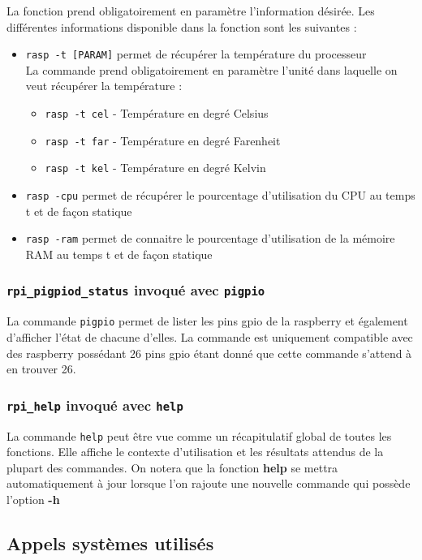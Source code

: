 \documentclass[10pt,a4paper]{article}
\begin{document}
La fonction prend obligatoirement en paramètre l'information désirée. Les différentes informations disponible dans la fonction sont les suivantes :

\begin{itemize}
\item \texttt{rasp -t [PARAM]} permet de récupérer la température du processeur\\

La commande prend obligatoirement en paramètre l'unité dans laquelle on veut récupérer la température : 
\begin{itemize}
\item \texttt{rasp -t cel} - Température en degré Celsius
\item \texttt{rasp -t far} - Température en degré Farenheit
\item \texttt{rasp -t kel} - Température en degré Kelvin
\end{itemize}

\item \texttt{rasp -cpu} permet de récupérer le pourcentage d'utilisation du CPU au temps t et de façon statique

\item \texttt{rasp -ram} permet de connaitre le pourcentage d'utilisation de la mémoire RAM au temps t et de façon statique
\end{itemize}

\subsubsection{\texttt{rpi\_pigpiod\_status} invoqué avec \texttt{pigpio}}

La commande \texttt{pigpio} permet de lister les pins gpio de la raspberry et également d'afficher l'état de chacune d'elles. La commande est uniquement compatible avec des raspberry possédant 26 pins gpio étant donné que cette commande s'attend à en trouver 26.

\subsubsection{\texttt{rpi\_help} invoqué avec \texttt{help}}
La commande \texttt{help} peut être vue comme un récapitulatif global de toutes les fonctions. Elle affiche le contexte d'utilisation et les résultats attendus de la plupart des commandes. On notera que la fonction \textbf{help} se mettra automatiquement à jour lorsque l'on rajoute une nouvelle commande qui possède l'option \textbf{-h}  
\subsection{Appels systèmes utilisés}
\end{document}

